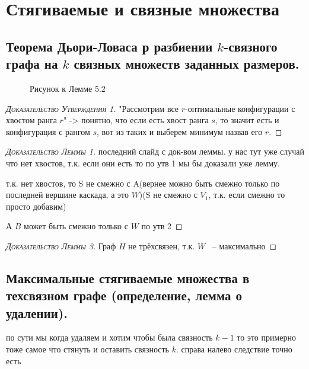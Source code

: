 \newpage

\section{Стягиваемые и связные множества}

\subsection{Теорема Дьори-Ловаса р разбиении $k$-связного графа на $k$ связных множеств заданных размеров.}


\begin{figure}[ht]
    \centering
    \caption{Рисунок к Лемме 5.2}
    \label{fig:lemma_5_2}
\end{figure}

\begin{proof}[\normalfont\textsc{Доказательство Утверждения 1}]
	"Рассмотрим все $r$-оптимальные конфигурации с хвостом ранга $r$" -> понятно, что если есть хвост ранга $s$, то значит есть и конфигурация с рангом  $s$, вот из таких и выберем минимум назвав его  $r$.
\end{proof}

\begin{proof}[\normalfont\textsc{Доказательство Леммы 1}]
	последний слайд с док-вом леммы. у нас тут уже случай что нет хвостов, т.к. если они есть то по утв 1 мы бы доказали уже лемму.

	т.к. нет хвостов, то S не смежно с A(вернее можно быть смежно только по последней вершине каскада, а это $W$)(S не смежно с $V_1$, т.к. если смежно то просто добавим)

	А $B$ может быть смежно только с  $W$ по утв 2
\end{proof}


\begin{proof}[\normalfont\textsc{Доказательство Леммы 3}]
	Граф $H$ не трёхсвязен, т.к.  $W$ ~-- максимально
\end{proof}

\subsection{Максимальные стягиваемые множества в техсвязном графе (определение, лемма о удалении).}


по сути мы когда удаляем и хотим чтобы была связность $k - 1$ то это примерно тоже самое что стянуть и оставить связность  $k$. справа налево следствие точно есть

